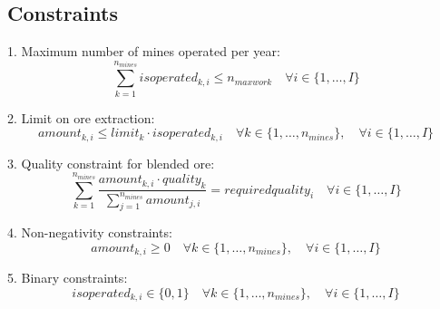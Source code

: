 \documentclass{article}
\begin{document}
\subsection*{Constraints}

1. Maximum number of mines operated per year:
\[
\sum_{k=1}^{n_{mines}} isoperated_{k,i} \leq n_{maxwork} \quad \forall i \in \{1, \ldots, I\}
\]

2. Limit on ore extraction:
\[
amount_{k,i} \leq limit_k \cdot isoperated_{k,i} \quad \forall k \in \{1, \ldots, n_{mines}\}, \quad \forall i \in \{1, \ldots, I\}
\]

3. Quality constraint for blended ore:
\[
\sum_{k=1}^{n_{mines}} \frac{amount_{k,i} \cdot quality_k}{\sum_{j=1}^{n_{mines}} amount_{j,i}} = requiredquality_i \quad \forall i \in \{1, \ldots, I\}
\]

4. Non-negativity constraints:
\[
amount_{k,i} \geq 0 \quad \forall k \in \{1, \ldots, n_{mines}\}, \quad \forall i \in \{1, \ldots, I\}
\]

5. Binary constraints:
\[
isoperated_{k,i} \in \{0, 1\} \quad \forall k \in \{1, \ldots, n_{mines}\}, \quad \forall i \in \{1, \ldots, I\}
\]
\end{document}
